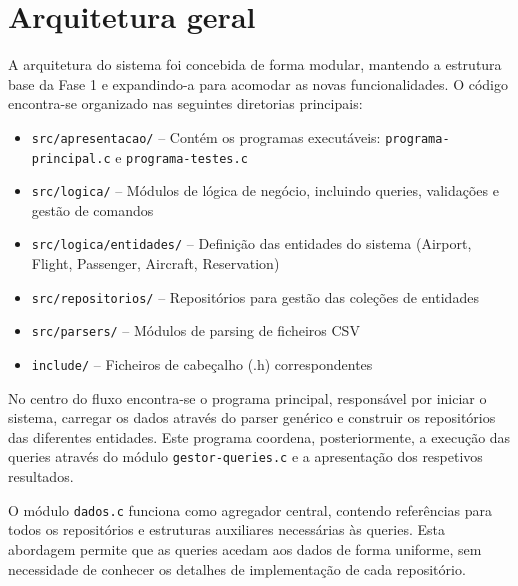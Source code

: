 \documentclass[a4paper,12pt]{scrreprt}
\begin{document}
\section{Arquitetura geral}

A arquitetura do sistema foi concebida de forma modular, mantendo a estrutura base da Fase 1 e expandindo-a para acomodar as novas funcionalidades. O código encontra-se organizado nas seguintes diretorias principais:

\begin{itemize}
    \item \texttt{src/apresentacao/} -- Contém os programas executáveis: \texttt{programa-principal.c} e \texttt{programa-testes.c}
    \item \texttt{src/logica/} -- Módulos de lógica de negócio, incluindo queries, validações e gestão de comandos
    \item \texttt{src/logica/entidades/} -- Definição das entidades do sistema (Airport, Flight, Passenger, Aircraft, Reservation)
    \item \texttt{src/repositorios/} -- Repositórios para gestão das coleções de entidades
    \item \texttt{src/parsers/} -- Módulos de parsing de ficheiros CSV
    \item \texttt{include/} -- Ficheiros de cabeçalho (.h) correspondentes
\end{itemize}

No centro do fluxo encontra-se o programa principal, responsável por iniciar o sistema, carregar os dados através do parser genérico e construir os repositórios das diferentes entidades. Este programa coordena, posteriormente, a execução das queries através do módulo \texttt{gestor-queries.c} e a apresentação dos respetivos resultados.

O módulo \texttt{dados.c} funciona como agregador central, contendo referências para todos os repositórios e estruturas auxiliares necessárias às queries. Esta abordagem permite que as queries acedam aos dados de forma uniforme, sem necessidade de conhecer os detalhes de implementação de cada repositório.
\end{document}
